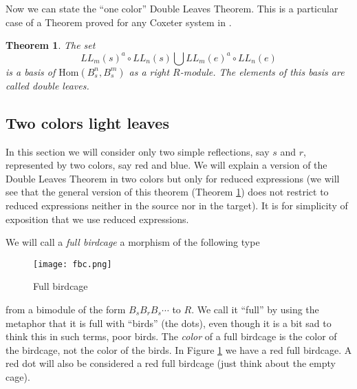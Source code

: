 \documentclass[12pt]{wart}
\newtheorem{thm}{Theorem}[section]
\theoremstyle{remark}
\begin{document}
Now we can state the ``one color'' Double Leaves Theorem. This is a particular case of a Theorem proved for any Coxeter system in \cite{li3}.
\begin{thm}\label{DL}
The set $$LL_m(s)^a\circ LL_n(s)\bigcup LL_m(e)^a\circ LL_n(e)$$ is a basis of $\mathrm{Hom}(B_s^n,B_s^m)$ as a right $R$-module. The elements of this basis are called \emph{double leaves.}
\end{thm}




\subsection{Two colors light leaves}

In this section we will consider only two simple reflections, say $s$ and $r$, represented by two colors, say red and blue. We will explain a version of the Double Leaves Theorem in two colors  but only for reduced expressions (we will see that  the general version of this theorem (Theorem \ref{DL})  does not restrict to reduced expressions neither in the source nor in the target). It is for simplicity of exposition that we use   reduced expressions. 

We will call a \emph{full birdcage} a morphism of the following type 
\begin{figure}[H] \begin{center}
 \texttt{[image: fbc.png]} 
\end{center}
\caption{Full birdcage}  
\label{fbc}
\end{figure} 
from a bimodule of the form $B_sB_rB_s\cdots$ to $R$. We call it ``full'' by using the metaphor that it is full with ``birds'' (the dots), even though it is a bit sad to think this in such terms, poor birds. The \emph{color} of a full birdcage is the color of the birdcage, not the color of the birds. In Figure \ref{fbc} we have a red full birdcage.  A red dot will also be considered a red full birdcage (just think about the empty cage).
\end{document}
